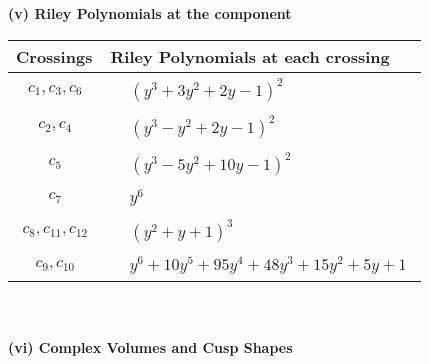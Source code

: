 \documentclass[1p]{elsarticle_modified}
\theoremstyle{definition}
\begin{document}
\newpage\renewcommand{\arraystretch}{1}
\flushleft \textbf{(v) Riley Polynomials at the component}\newline \\
\begin{tabular}{m{50pt}|m{274pt}}
Crossings & \hspace{64pt}Riley Polynomials at each crossing \\
\hline $$\begin{aligned}c_{1},c_{3},c_{6}\end{aligned}$$&$\begin{aligned}
&(y^3+3 y^2+2 y-1)^2
\end{aligned}$\\
\hline $$\begin{aligned}c_{2},c_{4}\end{aligned}$$&$\begin{aligned}
&(y^3- y^2+2 y-1)^2
\end{aligned}$\\
\hline $$\begin{aligned}c_{5}\end{aligned}$$&$\begin{aligned}
&(y^3-5 y^2+10 y-1)^2
\end{aligned}$\\
\hline $$\begin{aligned}c_{7}\end{aligned}$$&$\begin{aligned}
&y^6
\end{aligned}$\\
\hline $$\begin{aligned}c_{8},c_{11},c_{12}\end{aligned}$$&$\begin{aligned}
&(y^2+y+1)^3
\end{aligned}$\\
\hline $$\begin{aligned}c_{9},c_{10}\end{aligned}$$&$\begin{aligned}
&y^6+10 y^5+95 y^4+48 y^3+15 y^2+5 y+1
\end{aligned}$\\
\hline
\end{tabular}\\~\\
\newpage\flushleft \textbf{(vi) Complex Volumes and Cusp Shapes}
\end{document}
